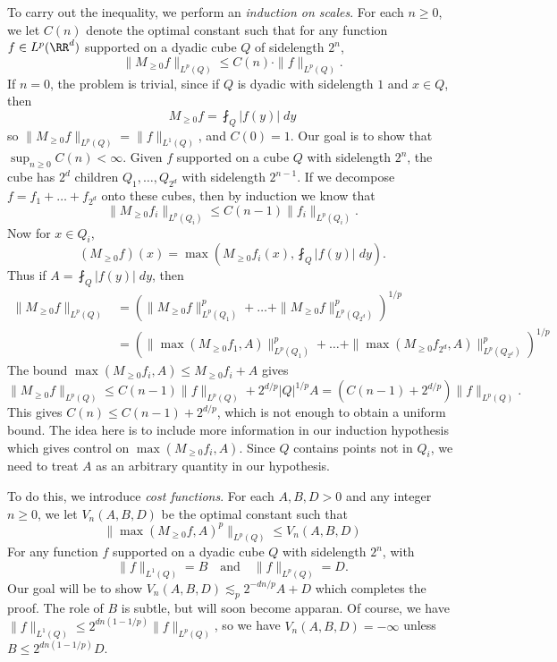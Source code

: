 To carry out the inequality, we perform an \emph{induction on scales}. For each $n \geq 0$, we let $C(n)$ denote the optimal constant such that for any function $f \in L^p(\RR^d)$ supported on a dyadic cube $Q$ of sidelength $2^n$,
%
\[ \| M_{\geq 0} f \|_{L^p(Q)} \leq C(n) \cdot \| f \|_{L^p(Q)}. \]
%
If $n = 0$, the problem is trivial, since if $Q$ is dyadic with sidelength $1$ and $x \in Q$, then
%
\[ M_{\geq 0} f = \fint_Q |f(y)|\; dy \]
%
so $\| M_{\geq 0} f \|_{L^p(Q)} = \| f \|_{L^1(Q)}$, and $C(0) = 1$. Our goal is to show that $\sup_{n \geq 0} C(n) < \infty$. Given $f$ supported on a cube $Q$ with sidelength $2^n$, the cube has $2^d$ children $Q_1,\dots,Q_{2^d}$ with sidelength $2^{n-1}$. If we decompose $f = f_1 + \dots + f_{2^d}$ onto these cubes, then by induction we know that
%
\[ \| M_{\geq 0} f_i \|_{L^p(Q_i)} \leq C(n-1) \| f_i \|_{L^p(Q_i)}. \]
%
Now for $x \in Q_i$,
%
\[ (M_{\geq 0} f)(x) = \max \left(M_{\geq 0} f_i(x), \fint_Q |f(y)|\; dy \right). \]
%
Thus if $A = \fint_Q |f(y)|\; dy$, then
%
\begin{align*}
  \| M_{\geq 0} f \|_{L^p(Q)} &= \left( \| M_{\geq 0} f \|_{L^p(Q_1)}^p + \dots + \| M_{\geq 0} f \|_{L^p(Q_{2^d})}^p \right)^{1/p}\\
  &= \left( \| \max(M_{\geq 0} f_1, A) \|_{L^p(Q_1)}^p + \dots + \| \max(M_{\geq 0} f_{2^d}, A) \|_{L^p(Q_{2^d})}^p \right)^{1/p}
\end{align*}
%
The bound $\max(M_{\geq 0} f_i, A) \leq M_{\geq 0} f_i + A$ gives
%
\[ \| M_{\geq 0} f \|_{L^p(Q)} \leq C(n-1) \| f \|_{L^p(Q)} + 2^{d/p} |Q|^{1/p} A = (C(n-1) + 2^{d/p}) \| f \|_{L^p(Q)}. \]
%
This gives $C(n) \leq C(n-1) + 2^{d/p}$, which is not enough to obtain a uniform bound. The idea here is to include more information in our induction hypothesis which gives control on $\max(M_{\geq 0} f_i, A)$. Since $Q$ contains points not in $Q_i$, we need to treat $A$ as an arbitrary quantity in our hypothesis.

To do this, we introduce \emph{cost functions}. For each $A,B,D > 0$ and any integer $n \geq 0$, we let $V_n(A,B,D)$ be the optimal constant such that
%
\[ \| \max(M_{\geq 0} f, A)^p \|_{L^p(Q)} \leq V_n(A,B,D) \]
%
For any function $f$ supported on a dyadic cube $Q$ with sidelength $2^n$, with
%
\[ \| f \|_{L^1(Q)} = B\quad\text{and}\quad \| f \|_{L^p(Q)} = D. \]
%
Our goal will be to show $V_n(A,B,D) \lesssim_p 2^{-dn/p} A + D$ which completes the proof. The role of $B$ is subtle, but will soon become apparan. Of course, we have $\| f \|_{L^1(Q)} \leq 2^{dn(1-1/p)} \| f \|_{L^p(Q)}$, so we have $V_n(A,B,D) = -\infty$ unless $B \leq 2^{dn(1 - 1/p)} D$.

